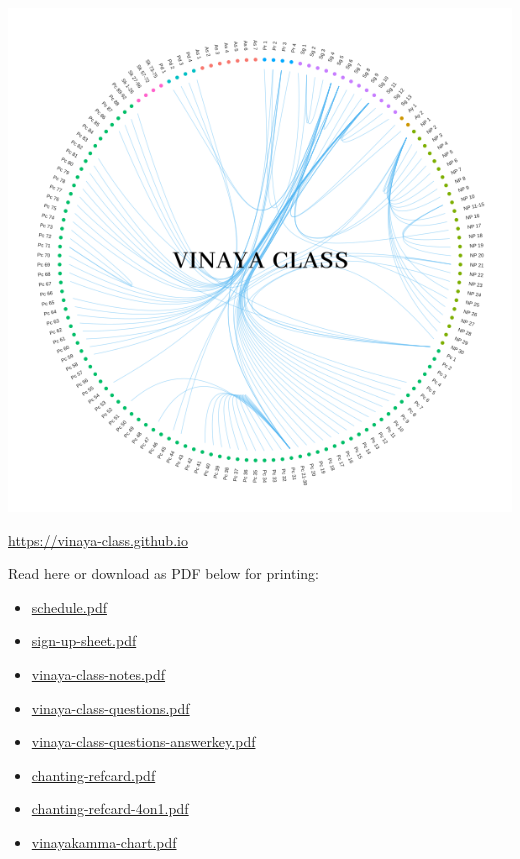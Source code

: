 \includegraphics{../../src/includes/figures/vinaya-class-title.png}

\url{https://vinaya-class.github.io}

Read here or download as PDF below for printing:

\begin{itemize}
\tightlist
\item
  \href{./includes/docs/schedule.pdf}{schedule.pdf}
\item
  \href{./includes/docs/sign-up-sheet.pdf}{sign-up-sheet.pdf}
\item
  \href{./includes/docs/vinaya-class-notes.pdf}{vinaya-class-notes.pdf}
\item
  \href{./includes/docs/vinaya-class-questions.pdf}{vinaya-class-questions.pdf}
\item
  \href{./includes/docs/vinaya-class-questions-answerkey.pdf}{vinaya-class-questions-answerkey.pdf}
\item
  \href{./includes/docs/chanting-refcard.pdf}{chanting-refcard.pdf}
\item
  \href{./includes/docs/chanting-refcard-4on1.pdf}{chanting-refcard-4on1.pdf}
\item
  \href{./includes/docs/vinayakamma-chart.pdf}{vinayakamma-chart.pdf}
\end{itemize}

